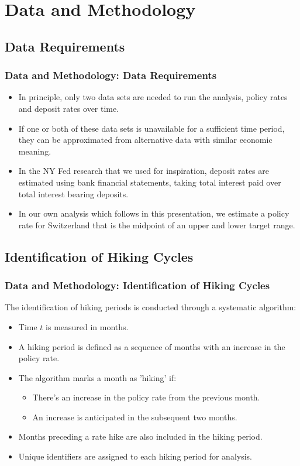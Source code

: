 \documentclass{beamer}
\begin{document}
\section{Data and Methodology}
\subsection{Data Requirements}
\begin{frame}
\frametitle{Data and Methodology: Data Requirements}
\begin{itemize}
  \item In principle, only two data sets are needed to run the analysis, policy rates and deposit rates over time.
  \item If one or both of these data sets is unavailable for a sufficient time period, they can be approximated from alternative data with similar economic meaning.
  \item In the NY Fed research that we used for inspiration, deposit rates are estimated using bank financial statements, taking total interest paid over total interest bearing deposits. 
  \item In our own analysis which follows in this presentation, we estimate a policy rate for Switzerland that is the midpoint of an upper and lower target range.
  \end{itemize}
\end{frame}

\subsection{Identification of Hiking Cycles}
\begin{frame}
\frametitle{Data and Methodology: Identification of Hiking Cycles}
The identification of hiking periods is conducted through a systematic algorithm:
\begin{itemize}
  \item Time \( t \) is measured in months.
  \item A hiking period is defined as a sequence of months with an increase in the policy rate.
  \item The algorithm marks a month as 'hiking' if:
  \begin{itemize}
    \item There's an increase in the policy rate from the previous month.
    \item An increase is anticipated in the subsequent two months.
  \end{itemize}
  \item Months preceding a rate hike are also included in the hiking period.
  \item Unique identifiers are assigned to each hiking period for analysis.
\end{itemize}
\end{frame}
\end{document}
